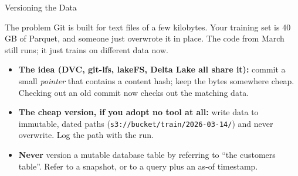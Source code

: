 
\begin{frame}{Versioning the Data}

    \begin{block}{The problem}
        Git is built for text files of a few kilobytes. Your training set is 40\,GB of Parquet, and someone
        just overwrote it in place. The code from March still runs; it just trains on different data now.
    \end{block}

    \vspace{0.4em}
    \centering

    \vspace{0.8em}
    \begin{itemize}
        \small
        \item \textbf{The idea (DVC, git-lfs, lakeFS, Delta Lake all share it):} commit a small
              \emph{pointer} that contains a content hash; keep the bytes somewhere cheap. Checking out an
              old commit now checks out the matching data.
        \item \textbf{The cheap version, if you adopt no tool at all:} write data to immutable, dated paths
              (\texttt{s3://bucket/train/2026-03-14/}) and never overwrite. Log the path with the run.
        \item \textbf{Never} version a mutable database table by referring to ``the customers table''. Refer
              to a snapshot, or to a query plus an as-of timestamp.
    \end{itemize}

\end{frame}
